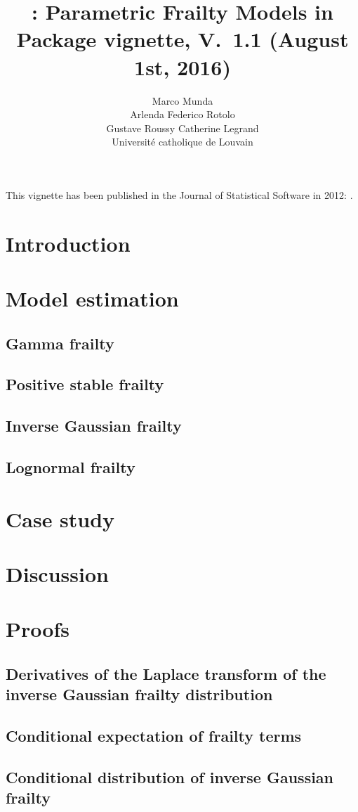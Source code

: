 \documentclass[nojss]{jss}
\author{Marco Munda\\Arlenda \And 
        Federico Rotolo\\Gustave Roussy \And
        Catherine Legrand\\Universit\'e catholique de Louvain}
\title{\pkg{parfm}: Parametric Frailty Models in \proglang{R}
        \\[.5em]\small{Package vignette, V.~1.1 (August 1st, 2016)}}
\begin{document}
This vignette has been published in the Journal of Statistical Software in 2012:
\cite{MundaEtal12}.

\section{Introduction}
  \label{sec:intro}
  

\section{Model estimation}
  \label{sec:model}
    
  \clearpage
  \subsection{Gamma frailty}
    \label{sec:model:gamma}
    
  \subsection{Positive stable frailty}
    \label{sec:model:PS}
    
  \subsection{Inverse Gaussian frailty}
    \label{sec:model:IG}
    
  \subsection{Lognormal frailty}
    \label{sec:model:LN}
    

\section{Case study}
  \label{sec:rexample}
  
  
\section{Discussion}
  \label{sec:concl}
  


% 


\clearpage
\appendix
\section{Proofs}
\subsection{Derivatives of the Laplace transform of the inverse Gaussian frailty distribution} 
  \label{app:derLTIG}
  
  
\clearpage
\subsection{Conditional expectation of frailty terms}
  \label{app:condEfrailty}
  

\clearpage
\subsection{Conditional distribution of inverse Gaussian frailty} 
  \label{app:condIG}
  
\end{document}
